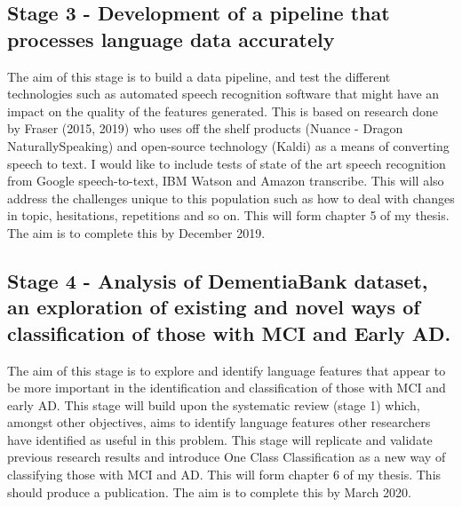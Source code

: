 \documentclass[11pt]{article}
\begin{document}
\subsection*{Stage 3 - Development of a pipeline that processes language data accurately}
The aim of this stage is to build a data pipeline, and test the different technologies such as automated speech recognition software that might have an impact on the quality of the features generated. This is based on research done by Fraser (2015, 2019) who uses off the shelf products (Nuance - Dragon NaturallySpeaking) and open-source technology (Kaldi) as a means of converting speech to text. I would like to include tests of state of the art speech recognition from Google speech-to-text, IBM Watson and Amazon transcribe. This will also address the challenges unique to this population such as how to deal with changes in topic, hesitations, repetitions and so on. This will form chapter 5 of my thesis. The aim is to complete this by December 2019.

\subsection*{Stage 4 - Analysis of DementiaBank dataset, an exploration of existing and novel ways of classification of those with MCI and Early AD.}
The aim of this stage is to explore and identify language features that appear to be more important in the identification and classification of those with MCI and early AD. This stage will build upon the systematic review (stage 1) which, amongst other objectives, aims to identify language features other researchers have identified as useful in this problem. This stage will replicate and validate previous research results and introduce One Class Classification as a new way of classifying those with MCI and AD. This will form chapter 6 of my thesis. This should produce a publication. The aim is to complete this by March 2020.
\end{document}
